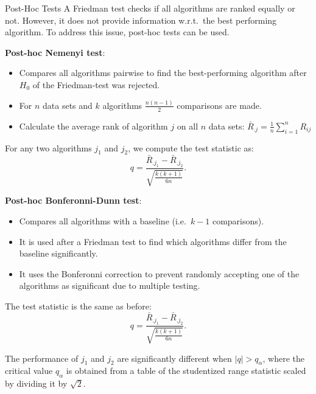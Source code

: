     \begin{frame}[c,allowframebreaks]{Post-Hoc Tests}
    A Friedman test checks if all algorithms are ranked equally or not. However,
    it does not provide information w.r.t.\ the best performing algorithm.
    To address this issue, post-hoc tests can be used.

    \bigskip

    \textbf{Post-hoc Nemenyi test}:
    \begin{itemize}
    \item Compares all algorithms pairwise to find the best-performing algorithm after $H_0$ of the Friedman-test was rejected.
    \item For $n$ data sets and $k$ algorithms $\frac{n(n-1)}{2}$ comparisons are made.
    \item Calculate the average rank of algorithm $j$ on all $n$ data sets: $\bar{R}_{.j} =\frac{1}{n} \sum_{i=1}^n R_{ij}$
    \end{itemize}

    For any two algorithms $j_1$ and $j_2$, we compute the test statistic as:
    $$q = \frac{\bar{R}_{.j_1} - \bar{R}_{.j_2}}{\sqrt{\frac{k(k+1)}{6n}}}.$$


    \framebreak

    \textbf{Post-hoc Bonferonni-Dunn test}:

    \begin{itemize}
    \item Compares all algorithms with a baseline (i.e.\ $k-1$ comparisons).
    \item It is used after a Friedman test to find which algorithms differ from the baseline significantly.
    \item It uses the Bonferonni correction to prevent randomly accepting one of the algorithms as significant due to multiple testing.
    \end{itemize}
    The test statistic is the same as before:
    $$q = \frac{\bar{R}_{.j_1} - \bar{R}_{.j_2}}{\sqrt{\frac{k(k+1)}{6n}}}.$$

    The performance of $j_1$ and $j_2$ are significantly different when $|q| > q_{\alpha}$, where the critical value $q_{\alpha}$ is obtained from a table of the studentized range statistic scaled by dividing it by $\sqrt{2}$.
    \end{frame}


